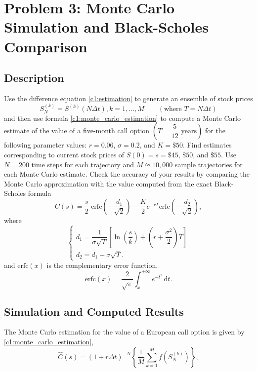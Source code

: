 \section{Problem 3: Monte Carlo Simulation and Black-Scholes Comparison} \label{c3}
\subsection{Description}
Use the difference equation \eqref{c1:estimation} to generate an ensemble of stock prices
\begin{equation*}
	S^{(k)}_N = S^{(k)}(N\Delta t), k = 1, \dots, M \qquad (\text{where } T = N\Delta t)
\end{equation*}
and then use formula \eqref{c1:monte_carlo_estimation} to compute a Monte Carlo estimate of the value of a five-month call option $\left(T = \dfrac{5}{12} \text{ years} \right)$ for the following parameter values: $r = 0.06$, $\sigma = 0.2$, and $K = \$50$. Find estimates corresponding to current stock prices of $S(0) = s = \$45$, $\$50$, and $\$55$. Use $N = 200$ time steps for each trajectory and $M \approxeq 10{,}000$ sample trajectories for each Monte Carlo estimate. Check the accuracy of your results by comparing the Monte Carlo approximation with the value computed from the exact Black-Scholes formula
\begin{equation}
	C(s) = \dfrac{s}{2} \text{ erfc}\left(-\dfrac{d_1}{\sqrt{2}}\right) - \dfrac{K}{2} e^{-rT} \text{erfc}\left(-\dfrac{d_2}{\sqrt{2}}\right),
	\label{c2:p3:black-scholes}
\end{equation}
where
\[
\begin{cases}
	d_1 = \dfrac{1}{\sigma \sqrt{T}} \left[ \ln\left(\dfrac{s}{k}\right) + \left(r + \dfrac{\sigma^2}{2}\right) T \right] \\[0.3cm]
	d_2 = d_1 - \sigma \sqrt{T}.
\end{cases}
\]
and $\text{erfc}(x)$ is the complementary error function.
\begin{equation*}
	\text{erfc}(x) = \dfrac{2}{\sqrt{\pi}} \int_x^{+\infty} e^{-t^2} \, \mathrm{d}t.
\end{equation*}

\subsection{Simulation and Computed Results}

The Monte Carlo estimation for the value of a European call option is given by \eqref{c1:monte_carlo_estimation},
\begin{equation*}
	\hat{C}(s) = (1 + r \Delta t)^{-N} \left\{ \frac{1}{M} \sum_{k=1}^M f(S_N^{(k)}) \right\},
\end{equation*}

